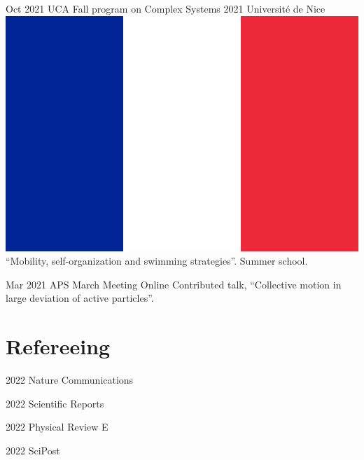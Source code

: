 \documentclass[a4paper]{cvtemplate_en} %
\begin{document}
\begin{cvbody}
\cvitem
	{Oct 2021}
	{}
	{UCA Fall program on Complex Systems 2021}
	{Universit\'e de Nice \includegraphics[height=0.8\myheight]{fr}}
	{}{}{}
	{}
	{``Mobility, self-organization and swimming strategies''. Summer school.\\}

\cvitem
	{Mar 2021}
	{}
	{APS March Meeting}
	{Online \faGlobe}
	{}{}{}
	{}
	{Contributed talk, ``Collective motion in large deviation of active particles''.\\}

\end{cvbody}


\section{Refereeing}

\begin{cvbody}

\cvitem
	{2022}
	{}
	{Nature Communications}
	{\vspace{-5pt}}
	{}{}{}
	{}
	{}

\cvitem
	{2022}
	{}
	{Scientific Reports}
	{}
	{}{}{}
	{}
	{}

\cvitem
	{2022}
	{}
	{Physical Review E}
	{}
	{}{}{}
	{}
	{}

\cvitem
	{2022}
	{}
	{SciPost}
	{}
	{}{}{}
	{}
	{}

\end{cvbody}

\end{document}
